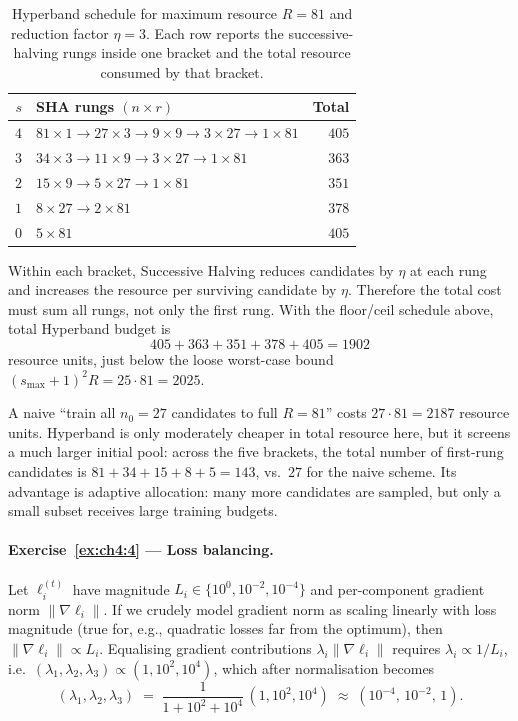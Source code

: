 \documentclass[11pt,a4paper]{report}
\begin{document}
\begin{table}[ht]
\centering
\small
\caption{Hyperband schedule for maximum resource $R=81$ and reduction factor $\eta=3$.  Each row reports the successive-halving rungs inside one bracket and the total resource consumed by that bracket.}
\label{tab:hyperband_r81_eta3}
\begin{tabular}{@{}r L{9.2cm} r@{}}
\toprule
$s$ & \textbf{SHA rungs $(n\times r)$} & \textbf{Total} \\
\midrule
$4$ & $81{\times}1 \to 27{\times}3 \to 9{\times}9 \to 3{\times}27 \to 1{\times}81$ & $405$ \\
$3$ & $34{\times}3 \to 11{\times}9 \to 3{\times}27 \to 1{\times}81$ & $363$ \\
$2$ & $15{\times}9 \to 5{\times}27 \to 1{\times}81$ & $351$ \\
$1$ & $8{\times}27 \to 2{\times}81$ & $378$ \\
$0$ & $5{\times}81$ & $405$ \\
\bottomrule
\end{tabular}
\end{table}

Within each bracket, Successive Halving reduces candidates by $\eta$ at each rung and increases the resource per surviving candidate by $\eta$.  Therefore the total cost must sum all rungs, not only the first rung.  With the floor/ceil schedule above, total Hyperband budget is
\[
   405 + 363 + 351 + 378 + 405 = 1902
\]
resource units, just below the loose worst-case bound $(s_{\max}+1)^2 R = 25 \cdot 81 = 2025$.

A naive ``train all $n_0 = 27$ candidates to full $R = 81$'' costs $27 \cdot 81 = 2187$ resource units.  Hyperband is only moderately cheaper in total resource here, but it screens a much larger initial pool: across the five brackets, the total number of first-rung candidates is $81 + 34 + 15 + 8 + 5 = 143$, vs.\ $27$ for the naive scheme.  Its advantage is adaptive allocation: many more candidates are sampled, but only a small subset receives large training budgets.

\paragraph{Exercise~\ref{ex:ch4:4} --- Loss balancing.}
Let $\ell_i^{(t)}$ have magnitude $L_i \in \{10^0, 10^{-2}, 10^{-4}\}$ and per-component gradient norm $\|\nabla\ell_i\|$.  If we crudely model gradient norm as scaling linearly with loss magnitude (true for, e.g., quadratic losses far from the optimum), then $\|\nabla \ell_i\| \propto L_i$.  Equalising gradient contributions $\lambda_i \|\nabla\ell_i\|$ requires $\lambda_i \propto 1/L_i$, i.e.\ $(\lambda_1, \lambda_2, \lambda_3) \propto (1, 10^2, 10^4)$, which after normalisation becomes
\[
   (\lambda_1, \lambda_2, \lambda_3) \;=\; \frac{1}{1 + 10^2 + 10^4}\,(1, 10^2, 10^4) \;\approx\; (10^{-4},\, 10^{-2},\, 1).
\]
\end{document}
